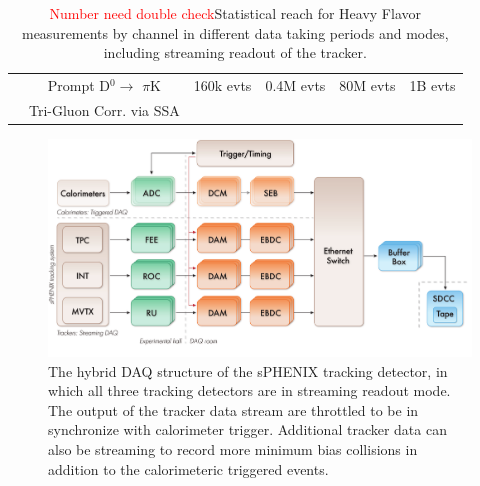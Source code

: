 \begin{table}
\begin{tabular}{|c|c|c|c|c|c|}
        &
        Prompt D$^{0} \rightarrow$ $\pi$K  
        & 160k evts  
        & 0.4M evts
        & 80M evts 
        & 1B evts \\ 
         & Tri-Gluon Corr. via SSA 
        &   
        &  
        & 
        &  \\ \hline 
        
    \end{tabular}
    \caption{{\textcolor{red}{Number need double check}}Statistical reach for Heavy Flavor \pp measurements by channel in different data taking periods and modes, including streaming readout of the tracker.}
    \label{tab:HFppreach}
\end{table}
 




\begin{figure}[htbp]
\begin{center}
\includegraphics[width=.8\linewidth]{figs/DAQ structure_rev3.pdf}
\caption{The hybrid DAQ structure of the sPHENIX tracking detector, in which  all three tracking detectors are in streaming readout mode. The output of the tracker data stream are throttled to be in synchronize with calorimeter trigger. Additional tracker data can also be streaming to record more minimum bias collisions in addition to the calorimeteric triggered events.}
\label{fig:TPC-DAQ-structure}
\end{center}
\end{figure}

